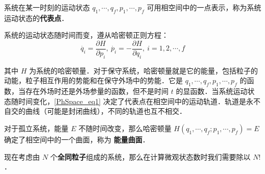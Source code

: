 系统在某一时刻的运动状态 $q_1,\cdots,q_f,p_1,\cdots,p_f$ 可用相空间中的一点表示，称为系统运动状态的\textbf{代表点}．

系统的运动状态随时间而变，遵从哈密顿正则方程：
\begin{equation}\label{PhSpace_eq1}
\dot{q_i}=\frac{\partial H}{\partial p_i},\ \dot{p_i}=-\frac{\partial H}{\partial q_i},\ i=1,2,\cdots,f
\end{equation}

其中 $H$ 为系统的哈密顿量．对于保守系统，哈密顿量就是它的能量，包括粒子的动能，粒子相互作用的势能和在保守外场中的势能．它是 $q_1,\cdots,q_f,p_1,\cdots,p_f$ 的函数，当存在外场时还是外场参量的函数，但不是时间 $t$ 的显函数．当系统运动状态随时间变化，\autoref{PhSpace_eq1} 决定了代表点在相空间中的运动轨道．轨道是永不自交的曲线（可能是封闭曲线），不同的轨道也互不相交．

对于孤立系统，能量 $E$ 不随时间改变，那么哈密顿量 $H(q_1,\cdots,q_f;p_1,\cdots,p_f)=E$ 确定了相空间中的一个曲面，称为 \textbf{能量曲面}．

现在考虑由 $N$ 个\textbf{全同粒子}组成的系统，那么在计算微观状态数时我们需要除以 $N!$．